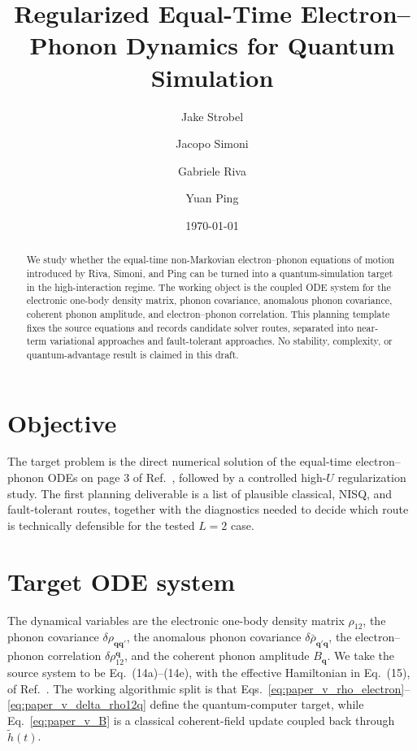 \documentclass[
  reprint,
  amsmath,
  amssymb,
  aps,
  pra,
  nofootinbib,
  superscriptaddress,
  floatfix
]{revtex4-2}
\begin{document}
\title{Regularized Equal-Time Electron--Phonon Dynamics for Quantum Simulation}

\author{Jake Strobel}
\author{Jacopo Simoni}
\author{Gabriele Riva}
\author{Yuan Ping}

\date{\today}

\begin{abstract}
We study whether the equal-time non-Markovian electron--phonon equations of motion introduced by Riva, Simoni, and Ping can be turned into a quantum-simulation target in the high-interaction regime. The working object is the coupled ODE system for the electronic one-body density matrix, phonon covariance, anomalous phonon covariance, coherent phonon amplitude, and electron--phonon correlation. This planning template fixes the source equations and records candidate solver routes, separated into near-term variational approaches and fault-tolerant approaches. No stability, complexity, or quantum-advantage result is claimed in this draft.
\end{abstract}

\maketitle

\section{Objective}

The target problem is the direct numerical solution of the equal-time electron--phonon ODEs on page 3 of Ref.~\cite{RivaSimoniPing2026}, followed by a controlled high-\(U\) regularization study. The first planning deliverable is a list of plausible classical, NISQ, and fault-tolerant routes, together with the diagnostics needed to decide which route is technically defensible for the tested \(L=2\) case.

\section{Target ODE system}
\label{sec:target_ode}

The dynamical variables are the electronic one-body density matrix \(\rho_{12}\), the phonon covariance \(\delta\rho_{\mathbf q\mathbf q'}\), the anomalous phonon covariance \(\delta\bar\rho_{\mathbf q'\mathbf q}\), the electron--phonon correlation \(\delta\rho^{\mathbf q}_{12}\), and the coherent phonon amplitude \(B_{\mathbf q}\). We take the source system to be Eq.~(14a)--(14e), with the effective Hamiltonian in Eq.~(15), of Ref.~\cite{RivaSimoniPing2026}. The working algorithmic split is that Eqs.~\eqref{eq:paper_v_rho_electron}--\eqref{eq:paper_v_delta_rho12q} define the quantum-computer target, while Eq.~\eqref{eq:paper_v_B} is a classical coherent-field update coupled back through \(\tilde h(t)\).
\end{document}
